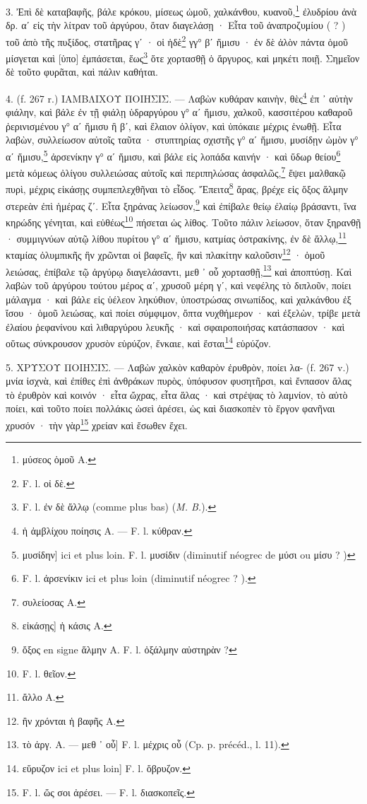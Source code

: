 \documentclass[a4paper, 11pt, oneside, polutonikogreek, french]{article}
\begin{document}
3. Ἐπὶ δὲ καταβαφῆς, βάλε κρόκου, μίσεως ὠμοῦ, χαλκάνθου, κυανοῦ,\footnote{μύσεος ὁμοῦ A.} ἐλυδρίου ἀνὰ δρ. αʹ εἰς τὴν λίτραν τοῦ ἀργύρου, ὅταν διαγελάσῃ · Εἶτα τοῦ ἀναπροζυμίου ( ? ) τοῦ ἀπὸ τῆς πυξίδος, στατῆρας γʹ · οἱ ἡδὲ\footnote{F. l. οἰ δὲ.} γγ° βʹ ἥμισυ · ἐν δὲ ἀλὸν πάντα ὁμοῦ μίσγεται καὶ [ὑπο] ἐμπάσεται, ἕως\footnote{F. l. ἐν δὲ ἄλλῳ (comme plus bas) (\emph{M. B.}).} ὅτε χορτασθῇ ὁ ἄργυρος, καὶ μηκέτι ποιῇ. Σημεῖον δὲ τοῦτο φυρᾶται, καὶ πάλιν καθήται.

4. (f. 267 r.) ΙΑΜΒΛΙΧΟΥ ΠΟΙΗΣΙΣ. --- Λαβὼν κυθάραν καινὴν, θὲς\footnote{ἡ ἀμβλίχου ποίησις A. --- F. l. κύθραν.} ἐπ ᾽ αὐτὴν φιάλην, καὶ βάλε ἐν τῇ φιάλῃ ὑδραργύρου γ° αʹ ἥμισυ, χαλκοῦ, κασσιτέρου καθαροῦ ῥερινισμένου γ° αʹ ἥμισυ ἢ βʹ, καὶ ἔλαιον ὀλίγον, καὶ ὑπόκαιε μέχρις ἑνωθῇ. Εἶτα λαβὼν, συλλείωσον αὐτοῖς ταῦτα · στυπτηρίας σχιστῆς γ° αʹ ἥμισυ, μυσίδῃν ὠμὸν γ° αʹ ἥμισυ,\footnote{μυσίδην] ici et plus loin. F. l. μυσίδιν (diminutif néogrec de μύσι ou μίσυ ? )} ἀρσενίκην γ° αʹ ἥμισυ, καὶ βάλε εἰς λοπάδα καινήν · καὶ ὕδωρ θείου\footnote{F. l. ἀρσενίκιν ici et plus loin (diminutif néogrec ? ).} μετὰ κόμεως ὀλίγου συλλειώσας αὐτοῖς καὶ περιπηλώσας ἀσφαλῶς,\footnote{συλείοσας A.} ἕψει μαλθακῷ πυρὶ, μέχρις εἰκάσῃς συμπεπλεχθῆναι τὸ εἶδος. Ἔπειτα\footnote{εἰκάσῃς] ἡ κάσις A.} ἄρας, βρέχε εἰς ὄξος ἅλμην στερεὰν ἐπὶ ἡμέρας ζʹ. Εἶτα ξηράνας λείωσον,\footnote{ὄξος en signe ἅλμην A. F. l. ὀξάλμην αὐστηρὰν ?} καὶ ἐπίβαλε θείῳ ἐλαίῳ βράσαντι, ἵνα κηρώδης γένηται, καὶ εὐθέως\footnote{F. l. θεῖον.} πήσεται ὡς λίθος. Τοῦτο πάλιν λείωσον, ὅταν ξηρανθῇ · συμμιγνύων αὐτῷ λίθου πυρίτου γ° αʹ ἥμισυ, κατμίας ὀστρακίνης, ἐν δὲ ἄλλῳ,\footnote{ἄλλο A.} κταμίας ὀλυμπικῆς ἣν χρῶνται οἱ βαφεῖς, ἣν καὶ πλακίτην καλοῦσιν\footnote{ἢν χρόνται ἡ βαφῆς A.} · ὁμοῦ λειώσας, ἐπίβαλε τῷ ἀργύρῳ διαγελάσαντι, μεθ ᾽ οὗ χορτασθῇ,\footnote{τὸ ἀργ. A. --- μεθ ᾽ οὗ] F. l. μέχρις οὗ (Cp. p. précéd., l. 11).} καὶ ἀποπτύσῃ. Καὶ λαβὼν τοῦ ἀργύρου τούτου μέρος αʹ, χρυσοῦ μέρη γʹ, καὶ νεφέλης τὸ διπλοῦν, ποίει μάλαγμα · καὶ βάλε εἰς ὑέλεον ληκύθιον, ὑποστρώσας σινωπίδος, καὶ χαλκάνθου ἐξ ἴσου · ὁμοῦ λειώσας, καὶ ποίει σύμφιμον, ὄπτα νυχθήμερον · καὶ ἐξελὼν, τρίβε μετὰ ἐλαίου ῥεφανίνου καὶ λιθαργύρου λευκῆς · καὶ σφαιροποιήσας κατάσπασον · καὶ οὕτως σύνκρουσον χρυσὸν εὑρύζον, ἔνκαιε, καὶ ἔσται\footnote{εὕρυζον ici et plus loin] F. l. ὄβρυζον.} εὑρύζον.

5. ΧΡΥΣΟΥ ΠΟΙΗΣΙΣ. --- Λαβὼν χαλκὸν καθαρὸν ἐρυθρὸν, ποίει λα- (f. 267 v.) μνία ἰσχνὰ, καὶ ἐπίθες ἐπὶ ἀνθράκων πυρὸς, ὑπόφυσον φυσητῆρσι, καὶ ἔνπασον ἅλας τὸ ἐρυθρὸν καὶ κοινόν · εἶτα ὤχρας, εἶτα ἅλας · καὶ στρέψας τὸ λαμνίον, τὸ αὐτὸ ποίει, καὶ τοῦτο ποίει πολλάκις ὡσεὶ ἀρέσει, ὡς καὶ διασκοπὲν τὸ ἔργον φανῆναι χρυσόν · τὴν γὰρ\footnote{F. l. ὥς σοι ἀρέσει. --- F. l. διασκοπεῖς.} χρείαν καὶ ἔσωθεν ἔχει.
\end{document}
